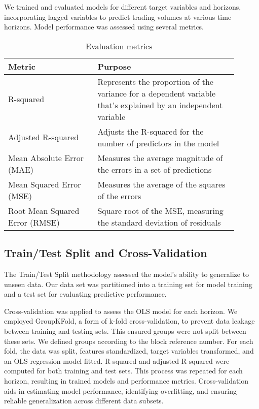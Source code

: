 \documentclass{article}
\begin{document}
We trained and evaluated models for different target variables and horizons, incorporating lagged variables to predict trading volumes at various time horizons. Model performance was assessed using several metrics.

\begin{table}[h!]
  \centering
  \begin{tabular}{|p{0.35\linewidth}|p{0.55\linewidth}|}
  \hline
  \textbf{Metric} & \textbf{Purpose} \\
  \hline
  R-squared & Represents the proportion of the variance for a dependent variable that's explained by an independent variable \\
  Adjusted R-squared & Adjusts the R-squared for the number of predictors in the model \\
  Mean Absolute Error (MAE) & Measures the average magnitude of the errors in a set of predictions \\
  Mean Squared Error (MSE) & Measures the average of the squares of the errors \\
  Root Mean Squared Error (RMSE) & Square root of the MSE, measuring the standard deviation of residuals \\
  \hline
  \end{tabular}
  \caption{Evaluation metrics}
  \label{tab:metrics}
  \end{table}  

\subsection{Train/Test Split and Cross-Validation}

The Train/Test Split methodology assessed the model's ability to generalize to unseen data. Our data set was partitioned into a training set for model training and a test set for evaluating predictive performance.

Cross-validation was applied to assess the OLS model for each horizon. We employed GroupKFold, a form of k-fold cross-validation, to prevent data leakage between training and testing sets. This ensured groups were not split between these sets. We defined groups according to the block reference number. For each fold, the data was split, features standardized, target variables transformed, and an OLS regression model fitted. R-squared and adjusted R-squared were computed for both training and test sets. This process was repeated for each horizon, resulting in trained models and performance metrics. Cross-validation aids in estimating model performance, identifying overfitting, and ensuring reliable generalization across different data subsets.
\end{document}
